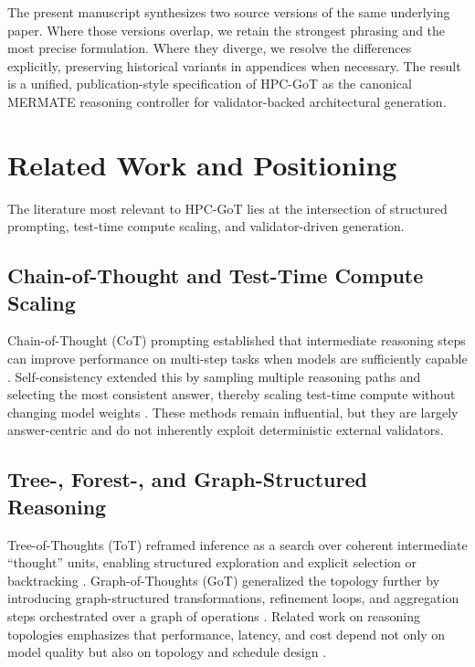 \documentclass[11pt,a4paper]{article}
\numberwithin{equation}{section}
\theoremstyle{definition}
\begin{document}
The present manuscript synthesizes two source versions of the same underlying paper. Where those versions overlap, we retain the strongest phrasing and the most precise formulation. Where they diverge, we resolve the differences explicitly, preserving historical variants in appendices when necessary. The result is a unified, publication-style specification of HPC-GoT as the canonical MERMATE reasoning controller for validator-backed architectural generation.

\section{Related Work and Positioning}

The literature most relevant to HPC-GoT lies at the intersection of structured prompting, test-time compute scaling, and validator-driven generation.

\subsection{Chain-of-Thought and Test-Time Compute Scaling}

Chain-of-Thought (CoT) prompting established that intermediate reasoning steps can improve performance on multi-step tasks when models are sufficiently capable \cite{wei2022chain}. Self-consistency extended this by sampling multiple reasoning paths and selecting the most consistent answer, thereby scaling test-time compute without changing model weights \cite{wang2022self}. These methods remain influential, but they are largely answer-centric and do not inherently exploit deterministic external validators.

\subsection{Tree-, Forest-, and Graph-Structured Reasoning}

Tree-of-Thoughts (ToT) reframed inference as a search over coherent intermediate ``thought'' units, enabling structured exploration and explicit selection or backtracking \cite{yao2023tree}. Graph-of-Thoughts (GoT) generalized the topology further by introducing graph-structured transformations, refinement loops, and aggregation steps orchestrated over a graph of operations \cite{besta2023graph,besta2024aaai}. Related work on reasoning topologies emphasizes that performance, latency, and cost depend not only on model quality but also on topology and schedule design \cite{topologies2024}. 
\end{document}
